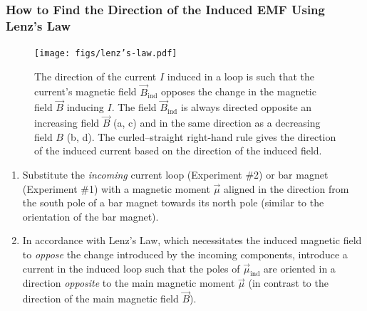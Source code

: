 \documentclass[12pt,b4paper]{article}
\begin{document}
\subsubsection*{How to Find the Direction of the Induced EMF Using Lenz's Law}
\begin{figure}[H]
    \centering
    \texttt{[image: figs/lenz's-law.pdf]}
    \caption{The direction of the current $I$ induced in a loop is such that the current’s magnetic field $\vec{B}_\text{ind}$ opposes the change in the magnetic field $\vec{B}$ inducing $I$. The field $\vec{B}_\text{ind}$ is always directed opposite an increasing field $\vec{B}$ (a, c) and in the same direction as a decreasing field $B$ (b, d). The curled–straight right-hand rule gives the direction of the induced current based on the direction of the induced field.}
    \label{fig:lenz's-law}
\end{figure}
\begin{enumerate}
    \item Substitute the \textit{incoming} current loop (Experiment \#2) or bar magnet (Experiment \#1) with a magnetic moment $\vec{\mu}$ aligned in the direction from the south pole of a bar magnet towards its north pole (similar to the orientation of the bar magnet). 
    \item In accordance with Lenz's Law, which necessitates the induced magnetic field to \textit{oppose} the change introduced by the incoming components, introduce a current in the induced loop such that the poles of $\vec{\mu}_\text{ind}$ are oriented in a direction \textit{opposite} to the main magnetic moment $\vec{\mu}$ (in contrast to the direction of the main magnetic field $\vec{B}$).
\end{enumerate}
\end{document}
